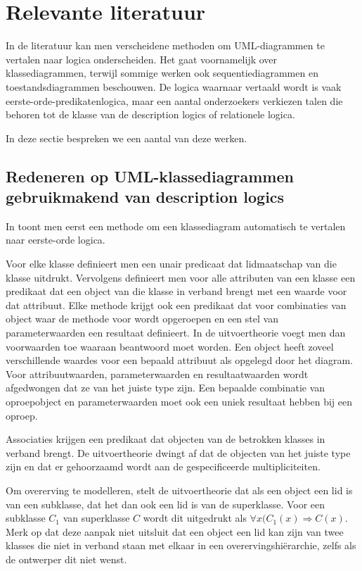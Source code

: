 \chapter{Relevante literatuur}
In de literatuur kan men verscheidene methoden om UML-diagrammen te vertalen naar logica onderscheiden. Het gaat voornamelijk over klassediagrammen, terwijl sommige werken ook sequentiediagrammen en toestandsdiagrammen beschouwen. De logica waarnaar vertaald wordt is vaak eerste-orde-predikatenlogica, maar een aantal onderzoekers verkiezen talen die behoren tot de klasse van de description logics of relationele logica.

In deze sectie bespreken we een aantal van deze werken.

\section{Redeneren op UML-klassediagrammen gebruikmakend van description logics}
In \cite{BerardiDaniela2005RoUc} toont men eerst een methode om een klassediagram automatisch te vertalen naar eerste-orde logica.

Voor elke klasse definieert men een unair predicaat dat lidmaatschap van die klasse uitdrukt. Vervolgens definieert men voor alle attributen van een klasse een predikaat dat een object van die klasse in verband brengt met een waarde voor dat attribuut. Elke methode krijgt ook een predikaat dat voor combinaties van object waar de methode voor wordt opgeroepen en een stel van parameterwaarden een resultaat definieert. In de uitvoertheorie voegt men dan voorwaarden toe waaraan beantwoord moet worden. Een object heeft zoveel verschillende waardes voor een bepaald attribuut als opgelegd door het diagram. Voor attribuutwaarden, parameterwaarden en resultaatwaarden wordt afgedwongen dat ze van het juiste type zijn. Een bepaalde combinatie van oproepobject en parameterwaarden moet ook een uniek resultaat hebben bij een oproep.

Associaties krijgen een predikaat dat objecten van de betrokken klasses in verband brengt. De uitvoertheorie dwingt af dat de objecten van het juiste type zijn en dat er gehoorzaamd wordt aan de gespecificeerde multipliciteiten.

Om overerving te modelleren, stelt de uitvoertheorie dat als een object een lid is van een subklasse, dat het dan ook een lid is van de superklasse. Voor een subklasse $C_1$ van superklasse $C$ wordt dit uitgedrukt als $\forall{x}(C_1(x) \Rightarrow C(x)$. Merk op dat deze aanpak niet uitsluit dat een object een lid kan zijn van twee klasses die niet in verband staan met elkaar in een overervingshi\"erarchie, zelfs als de ontwerper dit niet wenst.

